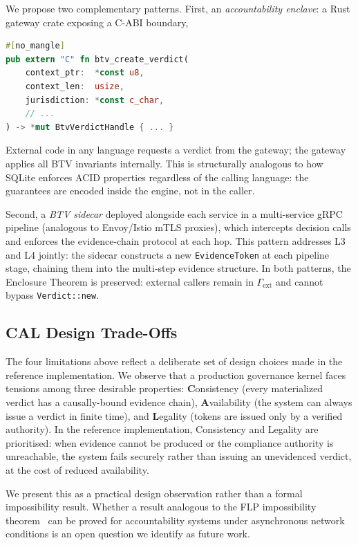 We propose two complementary patterns.
First, an \emph{accountability enclave}: a Rust gateway crate
exposing a C-ABI boundary,

\begin{lstlisting}[language=Rust,caption={FFI gateway
  (accountability enclave pattern)}]
#[no_mangle]
pub extern "C" fn btv_create_verdict(
    context_ptr:  *const u8,
    context_len:  usize,
    jurisdiction: *const c_char,
    // ...
) -> *mut BtvVerdictHandle { ... }
\end{lstlisting}

\noindent
External code in any language requests a verdict from the
gateway; the gateway applies all BTV invariants internally.
This is structurally analogous to how SQLite enforces ACID
properties regardless of the calling language: the
guarantees are encoded inside the engine, not in the caller.

Second, a \emph{BTV sidecar} deployed alongside each service in a
multi-service gRPC pipeline (analogous to Envoy/Istio mTLS
proxies), which intercepts decision calls and enforces the
evidence-chain protocol at each hop.
This pattern addresses L3 and L4 jointly: the sidecar
constructs a new \texttt{EvidenceToken} at each pipeline stage,
chaining them into the multi-step evidence structure.
In both patterns, the Enclosure Theorem is preserved: external
callers remain in $\Gamma_{\text{ext}}$ and cannot bypass
\texttt{Verdict::new}.

\subsection{CAL Design Trade-Offs}
\label{sec:cal}

The four limitations above reflect a deliberate set of design
choices made in the reference implementation.
We observe that a production governance kernel faces tensions among
three desirable properties:
\textbf{C}onsistency (every materialized verdict has a causally-bound
evidence chain),
\textbf{A}vailability (the system can always issue a verdict in
finite time), and
\textbf{L}egality (tokens are issued only by a verified authority).
In the reference implementation, Consistency and Legality are
prioritised: when evidence cannot be produced or the compliance
authority is unreachable, the system fails securely rather than
issuing an unevidenced verdict, at the cost of reduced availability.

We present this as a practical design observation rather than a
formal impossibility result.
Whether a result analogous to the FLP impossibility theorem~\cite{flp1985}
can be proved for accountability systems under asynchronous network
conditions is an open question we identify as future work.

